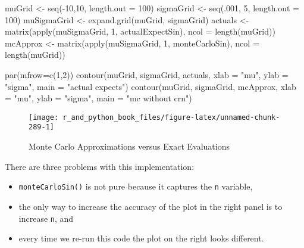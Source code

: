 \documentclass[
  12pt,
  krantz2]{krantz}
\makeatletter
\newenvironment{Shaded}{\begin{snugshade}}{\end{snugshade}}
\newcommand{\AttributeTok}[1]{\textcolor[rgb]{0.61,0.61,0.61}{#1}}
\newcommand{\DecValTok}[1]{\textcolor[rgb]{0.06,0.06,0.06}{#1}}
\newcommand{\FunctionTok}[1]{\textcolor[rgb]{0,0,0}{#1}}
\newcommand{\NormalTok}[1]{#1}
\newcommand{\OtherTok}[1]{\textcolor[rgb]{0.37,0.37,0.37}{#1}}
\newcommand{\SpecialCharTok}[1]{\textcolor[rgb]{0,0,0}{#1}}
\newcommand{\StringTok}[1]{\textcolor[rgb]{0.5,0.5,0.5}{#1}}
\providecommand{\tightlist}{%
  \setlength{\itemsep}{0pt}\setlength{\parskip}{0pt}}
\newenvironment{kframe}{%
\medskip{}
\setlength{\fboxsep}{.8em}
 \def\at@end@of@kframe{}%
 \ifinner\ifhmode%
  \def\at@end@of@kframe{\end{minipage}}%
  \begin{minipage}{\columnwidth}%
 \fi\fi%
 \def\FrameCommand##1{\hskip\@totalleftmargin \hskip-\fboxsep
 \colorbox{shadecolor}{##1}\hskip-\fboxsep
     \hskip-\linewidth \hskip-\@totalleftmargin \hskip\columnwidth}%
 \MakeFramed {\advance\hsize-\width
   \@totalleftmargin\z@ \linewidth\hsize
   \@setminipage}}%
 {\par\unskip\endMakeFramed%
 \at@end@of@kframe}
\renewenvironment{Shaded}{\begin{kframe}}{\end{kframe}}
\makeatother
\begin{document}
\begin{Shaded}
\begin{Highlighting}[]
\NormalTok{muGrid }\OtherTok{\textless{}{-}} \FunctionTok{seq}\NormalTok{(}\SpecialCharTok{{-}}\DecValTok{10}\NormalTok{,}\DecValTok{10}\NormalTok{, }\AttributeTok{length.out =} \DecValTok{100}\NormalTok{)}
\NormalTok{sigmaGrid }\OtherTok{\textless{}{-}} \FunctionTok{seq}\NormalTok{(.}\DecValTok{001}\NormalTok{, }\DecValTok{5}\NormalTok{, }\AttributeTok{length.out =} \DecValTok{100}\NormalTok{)}
\NormalTok{muSigmaGrid }\OtherTok{\textless{}{-}} \FunctionTok{expand.grid}\NormalTok{(muGrid, sigmaGrid)}
\NormalTok{actuals }\OtherTok{\textless{}{-}}  \FunctionTok{matrix}\NormalTok{(}\FunctionTok{apply}\NormalTok{(muSigmaGrid, }\DecValTok{1}\NormalTok{, actualExpectSin), }
                   \AttributeTok{ncol =} \FunctionTok{length}\NormalTok{(muGrid))}
\NormalTok{mcApprox }\OtherTok{\textless{}{-}} \FunctionTok{matrix}\NormalTok{(}\FunctionTok{apply}\NormalTok{(muSigmaGrid, }\DecValTok{1}\NormalTok{, monteCarloSin), }
                   \AttributeTok{ncol =} \FunctionTok{length}\NormalTok{(muGrid))}

\FunctionTok{par}\NormalTok{(}\AttributeTok{mfrow=}\FunctionTok{c}\NormalTok{(}\DecValTok{1}\NormalTok{,}\DecValTok{2}\NormalTok{))}
\FunctionTok{contour}\NormalTok{(muGrid, sigmaGrid, actuals, }
        \AttributeTok{xlab =} \StringTok{"mu"}\NormalTok{, }\AttributeTok{ylab =} \StringTok{"sigma"}\NormalTok{, }\AttributeTok{main =} \StringTok{"actual expects"}\NormalTok{)}
\FunctionTok{contour}\NormalTok{(muGrid, sigmaGrid, mcApprox, }
        \AttributeTok{xlab =} \StringTok{"mu"}\NormalTok{, }\AttributeTok{ylab =} \StringTok{"sigma"}\NormalTok{, }\AttributeTok{main =} \StringTok{"mc without crn"}\NormalTok{)}
\end{Highlighting}
\end{Shaded}

\begin{figure}

{\centering \texttt{[image: r\_and\_python\_book\_files/figure-latex/unnamed-chunk-289-1]} 

}

\caption{Monte Carlo Approximations versus Exact Evaluations}\label{fig:unnamed-chunk-289}
\end{figure}

There are three problems with this implementation:

\begin{itemize}
\tightlist
\item
  \texttt{monteCarloSin()} is not pure because it captures the \texttt{n} variable,
\item
  the only way to increase the accuracy of the plot in the right panel is to increase \texttt{n}, and
\item
  every time we re-run this code the plot on the right looks different.
\end{itemize}
\end{document}
